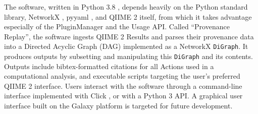 The software, written in Python 3.8 \parencite{python_software_foundation_python_2001},
depends heavily on the Python standard library, NetworkX \parencite{hagberg_exploring_2008},
pyyaml \parencite{simonov_pyyaml_2006}, and QIIME 2 itself, from which it takes
advantage especially of the PluginManager and the Usage API. Called “Provenance
Replay”, the software ingests QIIME 2 Results and parses their provenance data
into a Directed Acyclic Graph (DAG) implemented as a NetworkX \texttt{DiGraph}. It
produces outputs by subsetting and manipulating this \texttt{DiGraph} and its contents.
Outputs include bibtex-formatted \parencite{boulogne_bibtexparser_nodate}
citations for all Actions used in a computational analysis, and executable
scripts targeting the user’s preferred QIIME 2 interface. Users interact with
the software through a command-line interface implemented with Click \parencite{pallets_click_2014},
or with a Python 3 API. A graphical user interface built on the Galaxy platform
\parencite{afgan_galaxy_2018} is targeted for future development.
